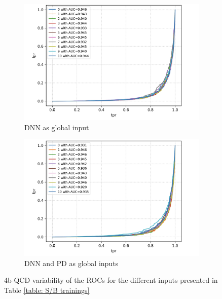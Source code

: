 \begin{figure}[hbt]
\centering
\begin{subfigure}{.5\textwidth}
  \centering
  \includegraphics[width=1.1\linewidth]{Images/7.S_B/Variability/4b QCD DNN.png}
  \caption{DNN as global input}
  \label{fig: 4b QCD DNN}
\end{subfigure}%
\begin{subfigure}{.5\textwidth}
  \centering
  \includegraphics[width=1.1\linewidth]{Images/7.S_B/Variability/4b QCD prob diff and DNN.png}
  \caption{DNN and PD as global inputs}
  \label{fig: 4b QCD DNN PD}
\end{subfigure}
\caption{4b-QCD variability of the ROCs for the different inputs presented in Table \ref{table: S/B trainings}}
\label{fig: 4b QCD v ariability}
\end{figure}

